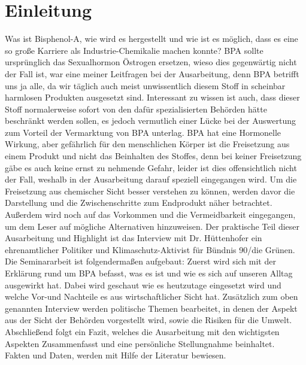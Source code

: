 \section{Einleitung}
Was ist Bisphenol-A, wie wird es hergestellt und wie ist es möglich, dass es eine so große Karriere als Industrie-Chemikalie machen konnte? BPA sollte ursprünglich das Sexualhormon \glqq Östrogen\grqq{} ersetzen, wieso dies gegenwärtig nicht der Fall ist, war eine meiner Leitfragen bei der Ausarbeitung, denn BPA betrifft uns ja alle, da wir täglich auch meist unwissentlich diesem Stoff in scheinbar \glqq harmlosen\grqq{} Produkten ausgesetzt sind. Interessant zu wissen ist auch, dass dieser Stoff normalerweise sofort von den dafür spezialisierten Behörden hätte beschränkt werden sollen, es jedoch vermutlich einer Lücke bei der Auswertung zum Vorteil der Vermarktung von BPA unterlag. BPA hat eine Hormonelle Wirkung, aber gefährlich für den menschlichen Körper ist die Freisetzung aus einem Produkt und nicht das Beinhalten des Stoffes, denn bei keiner Freisetzung gäbe es auch keine ernst zu nehmende Gefahr, leider ist dies offensichtlich nicht der Fall, weshalb in der Ausarbeitung darauf speziell eingegangen wird. Um die Freisetzung aus chemischer Sicht besser verstehen zu können, werden davor die Darstellung und die Zwischenschritte zum Endprodukt näher betrachtet. Außerdem wird noch auf das Vorkommen und die Vermeidbarkeit eingegangen, um dem Leser auf mögliche Alternativen hinzuweisen. Der praktische Teil dieser Ausarbeitung und \glqq Highlight\grqq{} ist das Interview mit Dr. Hüttenhofer ein ehrenamtlicher Politiker und Klimaschutz-Aktivist für Bündnis 90/die Grünen.
\\Die Seminararbeit ist folgendermaßen aufgebaut: Zuerst wird sich mit der Erklärung rund um BPA befasst, was es ist und wie es sich auf unseren Alltag ausgewirkt hat. Dabei wird geschaut wie es heutzutage eingesetzt wird und welche Vor-und Nachteile es aus wirtschaftlicher Sicht hat. Zusätzlich zum oben genannten Interview werden politische Themen bearbeitet, in denen der Aspekt aus der Sicht der Behörden vorgestellt wird, sowie die Risiken für die Umwelt. Abschließend folgt ein Fazit, welches die Ausarbeitung mit den wichtigsten Aspekten Zusammenfasst und eine persönliche Stellungnahme beinhaltet.
\\Fakten und Daten, werden mit Hilfe der Literatur bewiesen.
